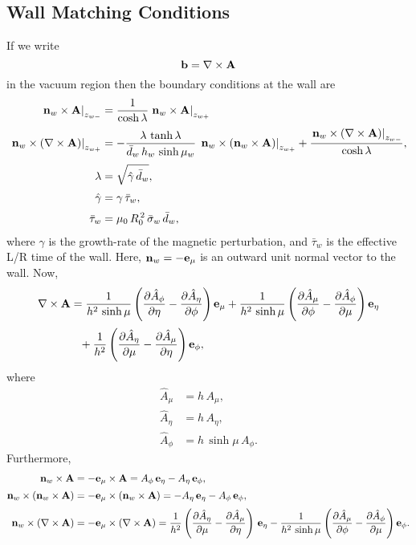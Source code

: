 \documentclass[12pt,prb,aps,notitlepage]{revtex4-1}
\begin{document}
\subsection{Wall Matching Conditions}
If we write
\begin{equation}
{\bf b} = \nabla\times{\bf A}
\end{equation}
in the vacuum region then the boundary conditions at the wall are 
\begin{align}
\left.{\bf n}_w\times {\bf A}\right|_{z_{w-}} &= \frac{1}{\cosh\lambda}\left.{\bf n}_w\times {\bf A}\right|_{z_{w+}} \\[0.5ex]
\left.{\bf n}_w\times (\nabla\times{\bf A})\right|_{z_{w+}}&= -\frac{\lambda\,\tanh\lambda}{\bar{d}_w\,h_w\,\sinh\mu_w}\,\left.{\bf n}_w\times({\bf n}_w\times{\bf A})\right|_{z_{w+}}+
\frac{\left.{\bf n}_w\times (\nabla\times{\bf A})\right|_{z_{w-}}}{\cosh\lambda},\\[0.5ex]
\lambda&= \sqrt{\hat{\gamma}\,\bar{d}_w},\\[0.5ex]
\hat\gamma&= \gamma\,\bar{\tau}_w,\\[0.5ex]
\bar{\tau}_w &=\mu_0\,R_0^{\,2}\,\bar{\sigma}_w\,\bar{d}_w,
\end{align}
where $\gamma$ is the growth-rate of the magnetic perturbation, and $\bar{\tau}_w$ is the effective L/R time of the wall. Here, ${\bf n}_w= -{\bf e}_\mu$ is an outward unit normal vector to the wall. Now,
\begin{align}
\nabla\times{\bf A} &= \frac{1}{h^2\,\sinh\mu}\left(\frac{\partial \hat{A}_\phi}{\partial \eta}-\frac{\partial\hat{A}_\eta}{\partial\phi}\right){\bf e}_\mu
+  \frac{1}{h^2\,\sinh\mu}\left(\frac{\partial \hat{A}_\mu}{\partial \phi}-\frac{\partial\hat{A}_\phi}{\partial\mu}\right){\bf e}_\eta\nonumber\\[0.5ex]
&\phantom{=}
+\frac{1}{h^2}\left(\frac{\partial \hat{A}_\eta}{\partial \mu}-\frac{\partial\hat{A}_\mu}{\partial\eta}\right){\bf e}_\phi,
\end{align}
where
\begin{align}
\hat{A}_\mu &= h\,A_\mu,\\[0.5ex]
\hat{A}_\eta&= h\,A_\eta,\\[0.5ex]
\hat{A}_\phi &= h\,\sinh\mu\,A_\phi.
\end{align}
Furthermore,
\begin{align}
{\bf n}_w\times {\bf A} &= -{\bf e}_\mu\times {\bf A} = A_\phi\,{\bf e}_\eta - A_\eta\,{\bf e}_\phi,\\[0.5ex]
{\bf n}_w\times ({\bf n}_w\times {\bf A})&= -{\bf e}_\mu\times ({\bf n}_w\times {\bf A} )= -A_\eta\,{\bf e}_\eta-A_\phi\,{\bf e}_\phi,\\[0.5ex]
{\bf n}_w\times (\nabla\times {\bf A}) &= -{\bf e}_\mu\times(\nabla\times {\bf A}) = \frac{1}{h^2}\left(\frac{\partial \hat{A}_\eta}{\partial \mu}-\frac{\partial\hat{A}_\mu}{\partial\eta}\right)\,{\bf e}_\eta- \frac{1}{h^2\,\sinh\mu}\left(\frac{\partial \hat{A}_\mu}{\partial \phi}-\frac{\partial\hat{A}_\phi}{\partial\mu}\right){\bf e}_\phi.
\end{align}
\end{document}
